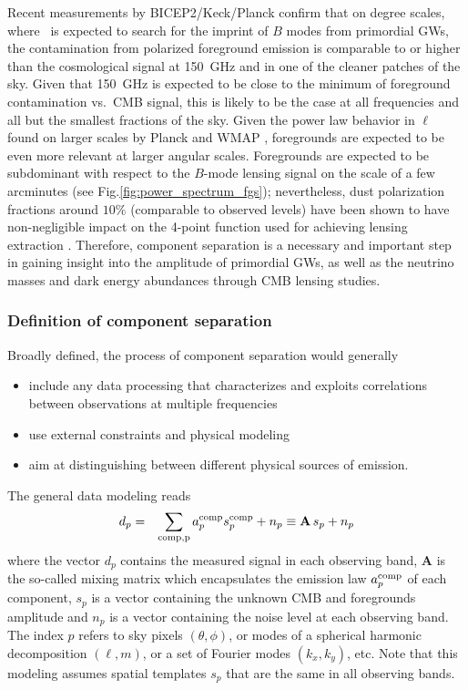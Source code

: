 Recent measurements by BICEP2/Keck/Planck \cite{bicepkeckplanck15} confirm that on degree scales, where 
\cmbexp\ is expected to search for 
the imprint of $B$ modes from primordial GWs, the contamination from polarized foreground emission is  comparable to or higher than the cosmological signal at 150~GHz and in one of the cleaner patches of the sky.
Given that 150~GHz is expected to be close to the minimum of foreground contamination vs.~CMB signal, this 
is likely to be the case at all frequencies and all but the smallest fractions of the sky.
Given the power law behavior in $\ell$ found on larger scales by Planck and WMAP \cite{planck15-9,page07}, foregrounds are expected to be even more relevant at larger angular scales. Foregrounds are expected to be subdominant  with respect to the $B$-mode lensing signal on the scale of a few arcminutes (see Fig.\ref{fig:power_spectrum_fgs}); nevertheless, dust polarization fractions around $10\%$ (comparable to observed levels) have been shown to have non-negligible impact on the 4-point function used for achieving lensing extraction \cite{fantaye12}. Therefore, component separation is a necessary and important step in gaining insight into the amplitude of primordial GWs, as well as the neutrino masses and dark energy abundances through CMB lensing studies.%

\subsubsection{Definition of component separation}

Broadly defined, the process of component separation would generally
\begin{itemize}
	\item include any data processing that characterizes and exploits correlations between observations at multiple frequencies
	\item use external constraints and physical modeling
	\item aim at distinguishing between different physical sources of emission.
\end{itemize}

The general data modeling reads
\begin{eqnarray}
	\centering	
		d_p &=& \sum_{\rm comp, p} a_p^{\rm comp} s^{\rm comp}_p + n_p \equiv \mathbf{A}\,s_p + n_p
	\label{eq:comp_sep_data_modeling}
\end{eqnarray}
where the vector $d_p$ contains the measured signal in each observing band, $\mathbf{A}$ is the so-called mixing matrix which encapsulates the emission law $a_p^{\rm comp}$ of each component, $s_p$ is a vector containing the unknown CMB and foregrounds amplitude and $n_p$ is a vector containing the noise level at each observing band. The index $p$ refers to sky pixels $\left( \theta, \phi \right)$, or modes of a spherical harmonic decomposition $\left( \ell, m\right)$, or a set of Fourier modes $\left(k_x,k_y\right)$, etc. Note that this modeling assumes spatial templates $s_p$ that are the same in all observing bands.

